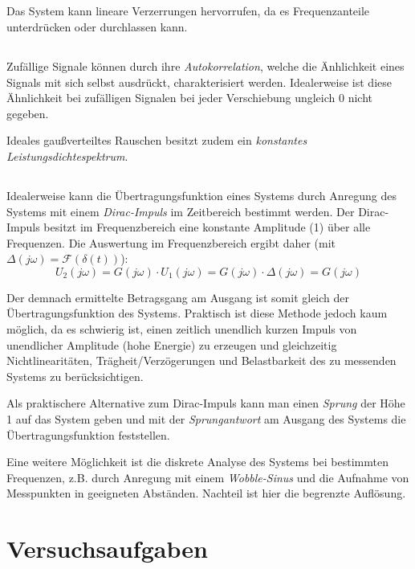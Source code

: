 \documentclass[a4paper, 12pt]{article}
\begin{document}
\subsection{}
Das System kann lineare Verzerrungen hervorrufen, da es Frequenzanteile
unterdrücken oder durchlassen kann.

\subsection{}
Zufällige Signale können durch ihre \emph{Autokorrelation}, welche die Änhlichkeit eines
Signals mit sich selbst ausdrückt, charakterisiert werden. Idealerweise ist
diese Ähnlichkeit bei zufälligen Signalen bei jeder Verschiebung ungleich 0 nicht gegeben.

Ideales gaußverteiltes Rauschen besitzt zudem ein \emph{konstantes
Leistungsdichtespektrum}.

\subsection{}

Idealerweise kann die Übertragungsfunktion eines Systems durch Anregung des
Systems mit einem \emph{Dirac-Impuls} im Zeitbereich bestimmt werden. Der Dirac-Impuls
besitzt im Frequenzbereich eine konstante Amplitude (1) über alle Frequenzen.
Die Auswertung im Frequenzbereich ergibt daher (mit $\Delta(j\omega) = \mathcal{F} (\delta(t))$):
$$ U_2(j \omega) = G(j \omega) \cdot U_1(j \omega) = G(j \omega) \cdot \Delta(j
\omega) = G(j \omega)$$

Der demnach ermittelte Betragsgang am Ausgang ist somit gleich der
Übertragungsfunktion des Systems. Praktisch ist diese Methode jedoch kaum
möglich, da es schwierig ist, einen zeitlich unendlich kurzen Impuls von
unendlicher Amplitude (hohe Energie) zu
erzeugen und gleichzeitig Nichtlinearitäten,
Trägheit/Verzögerungen und Belastbarkeit des zu messenden Systems zu berücksichtigen.

Als praktischere Alternative zum Dirac-Impuls kann man einen \emph{Sprung} der Höhe 1 auf das System geben und mit der \emph{Sprungantwort} am Ausgang des Systems die Übertragungsfunktion feststellen.

Eine weitere Möglichkeit ist die diskrete Analyse des Systems bei bestimmten
Frequenzen, z.B. durch Anregung mit einem \emph{Wobble-Sinus} und die Aufnahme von
Messpunkten in geeigneten Abständen. Nachteil ist hier die begrenzte Auflösung.

\section{Versuchsaufgaben}
\end{document}
